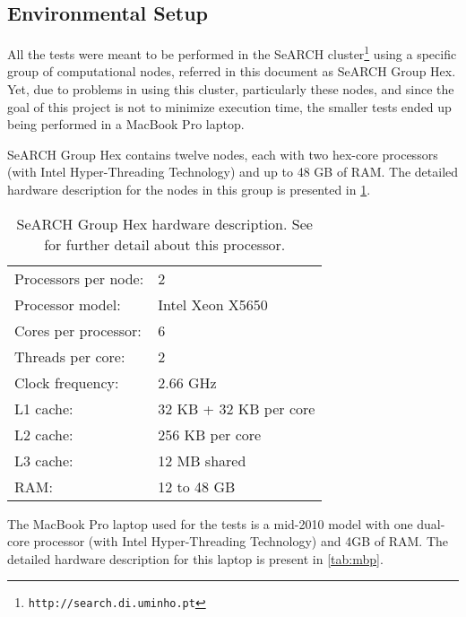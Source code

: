 \subsection{Environmental Setup}
\label{sec:environment}
All the tests were meant to be performed in the SeARCH cluster\footnote{\texttt{http://search.di.uminho.pt}} using a specific group of computational nodes, referred in this document as SeARCH Group Hex. Yet, due to problems in using this cluster, particularly these nodes, and since the goal of this project is not to minimize execution time, the smaller tests ended up being performed in a MacBook Pro laptop.

SeARCH Group Hex contains twelve nodes, each with two hex-core processors (with Intel{\textsuperscript{\textregistered}} Hyper-Threading Technology) and up to 48 GB of RAM. The detailed hardware description for the nodes in this group is presented in \cref{tab:grouphex}.

\begin{table}[!htp]
	\begin{center}
		\begin{tabular}{ll}
			\hline
			Processors per node: & 2	\\
			Processor model: & Intel{\textsuperscript{\textregistered}} Xeon{\textsuperscript{\textregistered}} X5650\\
			Cores per processor: & 6	\\
			Threads per core: & 2	\\
			Clock frequency: & 2.66 GHz	\\
			\hline
			L1 cache: & 32 KB + 32 KB per core	\\
			L2 cache: & 256 KB per core	\\
			L3 cache: & 12 MB shared	\\
			RAM: & 12 to 48 GB	\\
			\hline
		\end{tabular}
		\caption[SeARCH Group Hex hardware description]{SeARCH Group Hex hardware description. See \cite{xeon5600} for further detail about this processor.}
		\label{tab:grouphex}
	\end{center}
\end{table}

The MacBook Pro laptop used for the tests is a mid-2010 model with one dual-core processor (with Intel{\textsuperscript{\textregistered}} Hyper-Threading Technology) and 4GB of RAM. The detailed hardware description for this laptop is present in \cref{tab:mbp}.

